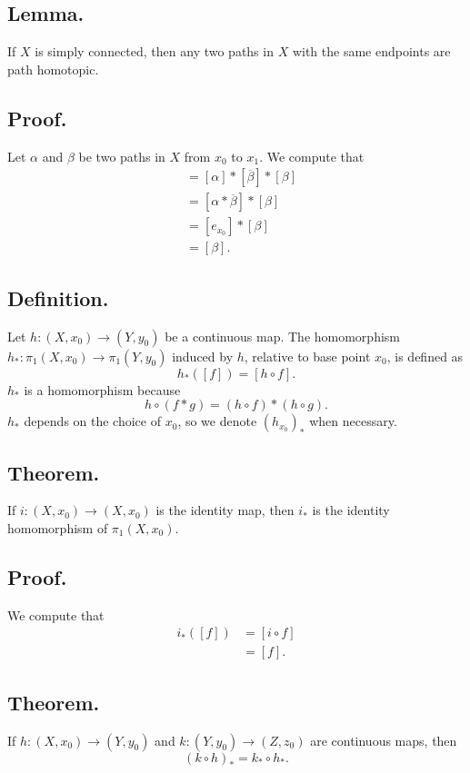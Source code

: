 \documentclass[titlepage]{article}
\begin{document}
\subsection{Lemma.} If $X$ is simply connected, then any two paths in $X$ with the same endpoints are path homotopic.

\subsection{Proof.} Let $\alpha$ and $\beta$ be two paths in $X$ from $x_{0}$ to $x_{1}$. We compute that 
\begin{align*}
    [\alpha] &= [\alpha] * [\overline{\beta}] * [\beta] \\
             &= [\alpha * \overline{\beta}] * [\beta] \\
             &= [e_{x_{0}}] * [\beta] \\
             &= [\beta].
\end{align*}

\subsection{Definition.} Let $h: (X, x_{0}) \to (Y, y_{0})$ be a continuous map. The homomorphism $h_{*}: \pi_{1}(X, x_{0}) \to \pi_{1}(Y, y_{0})$ induced by $h$, relative to base point $x_{0}$, is defined as 
$$h_{*}([f]) = [h \circ f].$$
$h_{*}$ is a homomorphism because 
$$h \circ (f * g) = (h \circ f) * (h \circ g).$$
$h_{*}$ depends on the choice of $x_{0}$, so we denote $(h_{x_{0}})_{*}$ when necessary.

\subsection{Theorem.} If $i: (X, x_{0}) \to (X, x_{0})$ is the identity map, then $i_{*}$ is the identity homomorphism of $\pi_{1}(X, x_{0})$.

\subsection{Proof.} We compute that 
\begin{align*}
    i_{*}([f]) &= [i \circ f] \\
               &= [f].
\end{align*}

\subsection{Theorem.} If $h: (X, x_{0}) \to (Y, y_{0})$ and $k: (Y, y_{0}) \to (Z, z_{0})$ are continuous maps, then 
$$(k \circ h)_{*} = k_{*} \circ h_{*}.$$
\end{document}
